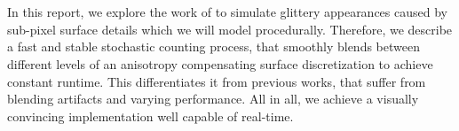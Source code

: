 \section*{}
\label{sec:abstract}

In this report, we explore the work of \textcite{deliot2023} to simulate glittery appearances caused by sub-pixel surface details which we will model procedurally.
%
Therefore, we describe a fast and stable stochastic counting process, that smoothly blends between different levels of an anisotropy compensating surface discretization to achieve constant runtime.
%
This differentiates it from previous works, that suffer from blending artifacts and varying performance.
%
All in all, we achieve a visually convincing implementation well capable of real-time.
